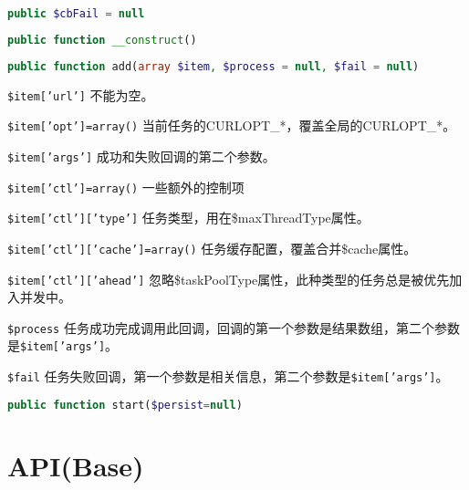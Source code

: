 \begin{lstlisting}[language=PHP]
public $cbFail = null
\end{lstlisting}




\begin{lstlisting}[language=PHP]
public function __construct()
\end{lstlisting}







\begin{lstlisting}[language=PHP]
public function add(array $item, $process = null, $fail = null)
\end{lstlisting}


\begin{compactitem}
\item \texttt{\$item['url']} 不能为空。
\item \texttt{\$item['opt']=array()} 当前任务的CURLOPT\_*，覆盖全局的CURLOPT\_*。
\item \texttt{\$item['args']} 成功和失败回调的第二个参数。
\item \texttt{\$item['ctl']=array()} 一些额外的控制项
\item \texttt{\$item['ctl']['type']} 任务类型，用在\$maxThreadType属性。
\item \texttt{\$item['ctl']['cache']=array()} 任务缓存配置，覆盖合并\$cache属性。
\item \texttt{\$item['ctl']['ahead']} 忽略\$taskPoolType属性，此种类型的任务总是被优先加入并发中。
\item \texttt{\$process} 任务成功完成调用此回调，回调的第一个参数是结果数组，第二个参数是\texttt{\$item['args']}。
\item \texttt{\$fail} 任务失败回调，第一个参数是相关信息，第二个参数是\texttt{\$item['args']}。
\end{compactitem}

\begin{lstlisting}[language=PHP]
public function start($persist=null)
\end{lstlisting}


\section{API(Base)}









